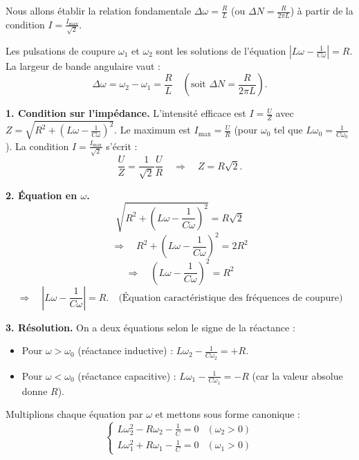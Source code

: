 \documentclass[11pt]{article}
\begin{document}
\noindent Nous allons établir la relation fondamentale $\Delta \omega = \frac{R}{L}$ (ou $\Delta N = \frac{R}{2\pi L}$) à partir de la condition $I = \frac{I_{\max}}{\sqrt{2}}$.

\begin{propriete}
Les pulsations de coupure $\omega_1$ et $\omega_2$ sont les solutions de l'équation $\left|L\omega - \frac{1}{C\omega}\right| = R$.
La largeur de bande angulaire vaut :
\[
\Delta \omega = \omega_2 - \omega_1 = \frac{R}{L} \quad \left(\text{soit } \Delta N = \frac{R}{2\pi L}\right).
\]
\end{propriete}

\begin{experience}[Démonstration guidée : établissement de $\Delta \omega = R/L$]
\textbf{1. Condition sur l'impédance.}
L'intensité efficace est $I = \frac{U}{Z}$ avec $Z = \sqrt{R^2 + \left(L\omega - \frac{1}{C\omega}\right)^2}$.
Le maximum est $I_{\max} = \frac{U}{R}$ (pour $\omega_0$ tel que $L\omega_0 = \frac{1}{C\omega_0}$).
La condition $I = \frac{I_{\max}}{\sqrt{2}}$ s'écrit :
\[
\frac{U}{Z} = \frac{1}{\sqrt{2}} \frac{U}{R} \quad \Rightarrow \quad Z = R\sqrt{2}.
\]

\textbf{2. Équation en $\omega$.}
\[
\sqrt{R^2 + \left(L\omega - \frac{1}{C\omega}\right)^2} = R\sqrt{2}
\]
\[
\Rightarrow \quad R^2 + \left(L\omega - \frac{1}{C\omega}\right)^2 = 2R^2
\]
\[
\Rightarrow \quad \left(L\omega - \frac{1}{C\omega}\right)^2 = R^2
\]
\[
\Rightarrow \quad \left| L\omega - \frac{1}{C\omega} \right| = R. \quad \text{(Équation caractéristique des fréquences de coupure)}
\]

\textbf{3. Résolution.}
On a deux équations selon le signe de la réactance :
\begin{itemize}
    \item Pour $\omega > \omega_0$ (réactance inductive) : $L\omega_2 - \frac{1}{C\omega_2} = +R$.
    \item Pour $\omega < \omega_0$ (réactance capacitive) : $L\omega_1 - \frac{1}{C\omega_1} = -R$ (car la valeur absolue donne $R$).
\end{itemize}
Multiplions chaque équation par $\omega$ et mettons sous forme canonique :
\[
\begin{cases}
L\omega_2^2 - R\omega_2 - \frac{1}{C} = 0 & (\omega_2 > 0)\\
L\omega_1^2 + R\omega_1 - \frac{1}{C} = 0 & (\omega_1 > 0)
\end{cases}
\]


\end{experience}
\end{document}

